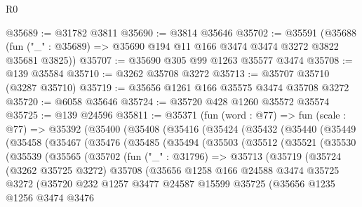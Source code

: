 \begin{lexlean}{R0}
\begin{coremodule}
@35689 := @31782 @3811
@35690 := @3814 @35646
@35702 := @35591
    (@35688 (fun ("_" : @35689) => @35690 @194 @11 @166 @3474 @3474 @3272 @3822 @35681 @3825))
@35707 := @35690 @305 @99 @1263 @35577 @3474
@35708 := @139 @35584
@35710 := @3262 @35708 @3272
@35713 := @35707 @35710 (@3287 @35710)
@35719 := @35656 @1261 @166 @35575 @3474 @35708 @3272
@35720 := @6058 @35646
@35724 := @35720 @428 @1260 @35572 @35574
@35725 := @139 @24596
@35811 := @35371
    (fun (word : @77) =>
    fun (scale : @77) =>
    @35392
      (@35400
        (@35408
          (@35416
            (@35424
              (@35432
                (@35440
                  (@35449
                    (@35458
                      (@35467
                        (@35476
                          (@35485
                            (@35494
                              (@35503
                                (@35512
                                  (@35521
                                    (@35530
                                      (@35539
                                        (@35565
                                          (@35702
                                            (fun ("_" : @31796) =>
                                            @35713
                                              (@35719
                                                (@35724
                                                  (@3262 @35725 @3272)
                                                  @35708
                                                  (@35656
                                                    @1258
                                                    @166
                                                    @24588
                                                    @3474
                                                    @35725
                                                    @3272
                                                    (@35720
                                                      @232
                                                      @1257
                                                      @3477
                                                      @24587
                                                      @15599
                                                      @35725
                                                      (@35656
                                                        @1235
                                                        @1256
                                                        @3474
                                                        @3476

\end{coremodule}
\end{lexlean}
